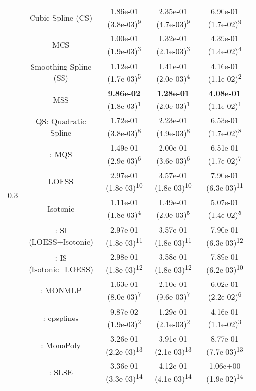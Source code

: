 \begin{tabular}{ccccc}
\multirow{14}{*}{0.3}&Cubic Spline (CS)& 1.86e-01 (3.8e-03)\textsuperscript{9}& 2.35e-01 (4.7e-03)\textsuperscript{9}& 6.90e-01 (1.7e-02)\textsuperscript{9}\tabularnewline
&MCS& 1.00e-01 (1.9e-03)\textsuperscript{3}& 1.32e-01 (2.1e-03)\textsuperscript{3}& 4.39e-01 (1.4e-02)\textsuperscript{4}\tabularnewline
&Smoothing Spline (SS)& 1.12e-01 (1.7e-03)\textsuperscript{5}& 1.41e-01 (2.0e-03)\textsuperscript{4}& 4.16e-01 (1.1e-02)\textsuperscript{2}\tabularnewline
&MSS& \textbf{9.86e-02} (1.8e-03)\textsuperscript{1}& \textbf{1.28e-01} (2.0e-03)\textsuperscript{1}& \textbf{4.08e-01} (1.1e-02)\textsuperscript{1}\tabularnewline
&QS: Quadratic Spline& 1.72e-01 (3.8e-03)\textsuperscript{8}& 2.23e-01 (4.9e-03)\textsuperscript{8}& 6.53e-01 (1.7e-02)\textsuperscript{8}\tabularnewline
&\textcite{heMonotoneBsplineSmoothing1998}: MQS& 1.49e-01 (2.9e-03)\textsuperscript{6}& 2.00e-01 (3.6e-03)\textsuperscript{6}& 6.51e-01 (1.7e-02)\textsuperscript{7}\tabularnewline
&LOESS& 2.97e-01 (1.8e-03)\textsuperscript{10}& 3.57e-01 (1.8e-03)\textsuperscript{10}& 7.90e-01 (6.3e-03)\textsuperscript{11}\tabularnewline
&Isotonic& 1.11e-01 (1.8e-03)\textsuperscript{4}& 1.49e-01 (2.0e-03)\textsuperscript{5}& 5.07e-01 (1.4e-02)\textsuperscript{5}\tabularnewline
&\textcite{mammenEstimatingSmoothMonotone1991}: SI (LOESS+Isotonic)& 2.97e-01 (1.8e-03)\textsuperscript{11}& 3.57e-01 (1.8e-03)\textsuperscript{11}& 7.90e-01 (6.3e-03)\textsuperscript{12}\tabularnewline
&\textcite{mammenEstimatingSmoothMonotone1991}: IS (Isotonic+LOESS)& 2.98e-01 (1.8e-03)\textsuperscript{12}& 3.58e-01 (1.8e-03)\textsuperscript{12}& 7.89e-01 (6.2e-03)\textsuperscript{10}\tabularnewline
&\textcite{cannonMonmlpMultilayerPerceptron2017}: MONMLP& 1.63e-01 (8.0e-03)\textsuperscript{7}& 2.10e-01 (9.6e-03)\textsuperscript{7}& 6.02e-01 (2.2e-02)\textsuperscript{6}\tabularnewline
&\textcite{navarro-garciaConstrainedSmoothingOutofrange2023}: cpsplines& 9.87e-02 (1.9e-03)\textsuperscript{2}& 1.29e-01 (2.1e-03)\textsuperscript{2}& 4.16e-01 (1.1e-02)\textsuperscript{3}\tabularnewline
&\textcite{murrayFastFlexibleMethods2016a}: MonoPoly& 3.26e-01 (2.2e-03)\textsuperscript{13}& 3.91e-01 (2.1e-03)\textsuperscript{13}& 8.77e-01 (7.7e-03)\textsuperscript{13}\tabularnewline
&\textcite{groeneboomConfidenceIntervalsMonotone2023}: SLSE& 3.36e-01 (3.3e-03)\textsuperscript{14}& 4.12e-01 (4.1e-03)\textsuperscript{14}& 1.06e+00 (1.9e-02)\textsuperscript{14}\tabularnewline
\bottomrule
\end{tabular}
